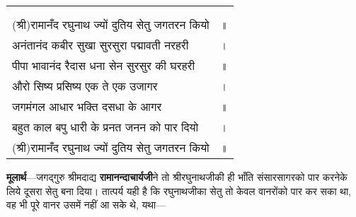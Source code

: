 {
{\bfseries
\setlength{\mylenone}{0pt}
\settowidth{\mylentwo}{}
\setlength{\mylenone}{\maxof{\mylenone}{\mylentwo}}
\settowidth{\mylentwo}{(श्री)रामानँद रघुनाथ ज्यों दुतिय सेतु जगतरन कियो}
\setlength{\mylenone}{\maxof{\mylenone}{\mylentwo}}
\settowidth{\mylentwo}{अनंतानंद कबीर सुखा सुरसुरा पद्मावती नरहरी}
\setlength{\mylenone}{\maxof{\mylenone}{\mylentwo}}
\settowidth{\mylentwo}{पीपा भावानंद रैदास धना सेन सुरसुर की घरहरी}
\setlength{\mylenone}{\maxof{\mylenone}{\mylentwo}}
\settowidth{\mylentwo}{औरो सिष्य प्रसिष्य एक ते एक उजागर}
\setlength{\mylenone}{\maxof{\mylenone}{\mylentwo}}
\settowidth{\mylentwo}{जगमंगल आधार भक्ति दसधा के आगर}
\setlength{\mylenone}{\maxof{\mylenone}{\mylentwo}}
\settowidth{\mylentwo}{बहुत काल बपु धारी के प्रनत जनन को पार दियो}
\setlength{\mylenone}{\maxof{\mylenone}{\mylentwo}}
\settowidth{\mylentwo}{(श्री)रामानँद रघुनाथ ज्यों दुतिय सेतु जगतरन कियो}
\setlength{\mylenone}{\maxof{\mylenone}{\mylentwo}}
\setlength{\mylentwo}{\baselineskip}
\setlength{\mylenone}{\mylenone + 1pt}
\begin{longtable}[l]{@{\hspace*{\mylen}}>{\setlength\parfillskip{0pt}}p{\mylenone}@{}@{}l@{}}
 & \\[-\the\mylentwo]
\centering{॥ ३६ \hspace*{-1.5mm}॥} & \\ \nopagebreak
(श्री)रामानँद रघुनाथ ज्यों दुतिय सेतु जगतरन कियो & ॥\\
अनंतानंद कबीर सुखा सुरसुरा पद्मावती नरहरी & ।\\ \nopagebreak
पीपा भावानंद रैदास धना सेन सुरसुर की घरहरी & ॥\\
औरो सिष्य प्रसिष्य एक ते एक उजागर & ।\\ \nopagebreak
जगमंगल आधार भक्ति दसधा के आगर & ॥\\
बहुत काल बपु धारी के प्रनत जनन को पार दियो & ।\\ \nopagebreak
(श्री)रामानँद रघुनाथ ज्यों दुतिय सेतु जगतरन कियो & ॥
\end{longtable}
}
}
\begin{sloppypar}\justifying{}
\textbf{मूलार्थ}—जगद्गुरु श्रीमदाद्य \textbf{रामानन्दाचार्यजी}ने तो श्रीरघुनाथजीकी ही भाँति संसार\-सागरको पार करनेके लिये दूसरा सेतु बना दिया। तात्पर्य यही है कि रघुनाथजीका सेतु तो केवल वानरोंको पार कर सका था, वह भी पूरे वानर उसमें नहीं आ सके थे, यथा—
\end{sloppypar}

